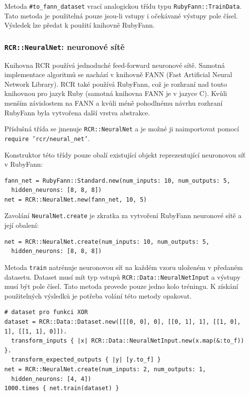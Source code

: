 \documentclass[a4paper]{article}
\begin{document}
Metoda \texttt{\#to\_fann\_dataset} vrací analogickou třídu typu
\texttt{RubyFann::TrainData}. Tato metoda je použitelná pouze jsou-li vstupy i
očekávané výstupy pole čísel. Výsledek lze předat k použití knihovně RubyFann.

\subsubsection{\texttt{RCR::NeuralNet}: neuronové sítě}
Knihovna RCR používá jednoduché feed-forward neuronové sítě. Samotná
implementace algoritmů se nachází v knihovně FANN (Fast Artificial Neural
Network Library\cite{nissen03}). RCR také používá RubyFann, což je rozhraní nad touto knihovnou
pro jazyk Ruby (samotná knihovna FANN je v jazyce C). Kvůli menším závislostem
na FANN a kvůli méně pohodlnému návrhu rozhraní RubyFann byla vytvořena další
vrstva abstrakce.

Příslušná třída se jmenuje \texttt{RCR::NeuralNet} a je možné ji naimportovat
pomocí \texttt{require 'rcr/neural\_net'}.

Konstruktor této třídy pouze obalí existující objekt reprezentující neuronovou
síť v RubyFann:
\begin{lstlisting}
fann_net = RubyFann::Standard.new(num_inputs: 10, num_outputs: 5,
  hidden_neurons: [8, 8, 8])
net = RCR::NeuralNet.new(fann_net, 10, 5)
\end{lstlisting}

Zavolání \texttt{NeuralNet.create} je zkratka za vytvoření RubyFann neuronové
sítě a její obalení:
\begin{lstlisting}
net = RCR::NeuralNet.create(num_inputs: 10, num_outputs: 5,
  hidden_neurons: [8, 8, 8])
\end{lstlisting}

Metoda \texttt{train} natrénuje neuronovou síť na každém vzoru uloženém
v předaném datasetu. Dataset musí mít typ vstupů \texttt{RCR::Data::NeuralNetInput} a
výstupy musí být pole čísel. Tato metoda provede pouze jedno kolo tréningu.
K získání použitelných výsledků je potřeba volání této metody opakovat.
\begin{lstlisting}
# dataset pro funkci XOR
dataset = RCR::Data::Dataset.new([[[0, 0], 0], [[0, 1], 1], [[1, 0], 1], [[1, 1], 0]]).
  transform_inputs { |x| RCR::Data::NeuralNetInput.new(x.map(&:to_f)) }.
  transform_expected_outputs { |y| [y.to_f] }
net = RCR::NeuralNet.create(num_inputs: 2, num_outputs: 1,
  hidden_neurons: [4, 4])
1000.times { net.train(dataset) }
\end{lstlisting}
\end{document}
